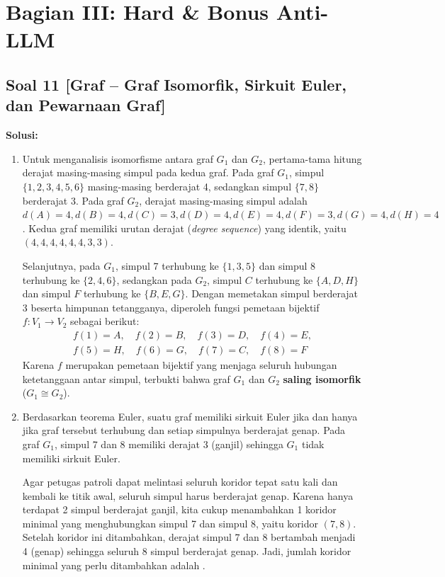 \documentclass[12pt,a4paper]{article}
\begin{document}
\newpage
\section*{Bagian III: Hard \& Bonus Anti-LLM}
\subsection*{Soal 11 [Graf -- Graf Isomorfik, Sirkuit Euler, dan Pewarnaan Graf]}
\textbf{Solusi:}

\begin{enumerate}[label=(\alph*)]
    \item Untuk menganalisis isomorfisme antara graf $G_1$ dan $G_2$, pertama-tama hitung derajat masing-masing simpul pada kedua graf. Pada graf $G_1$, simpul $\{1, 2, 3, 4, 5, 6\}$ masing-masing berderajat 4, sedangkan simpul $\{7, 8\}$ berderajat 3. Pada graf $G_2$, derajat masing-masing simpul adalah $d(A)=4, d(B)=4, d(C)=3, d(D)=4, d(E)=4, d(F)=3, d(G)=4, d(H)=4$. Kedua graf memiliki urutan derajat (\textit{degree sequence}) yang identik, yaitu $(4, 4, 4, 4, 4, 4, 3, 3)$. 
    
    Selanjutnya, pada $G_1$, simpul 7 terhubung ke $\{1, 3, 5\}$ dan simpul 8 terhubung ke $\{2, 4, 6\}$, sedangkan pada $G_2$, simpul $C$ terhubung ke $\{A, D, H\}$ dan simpul $F$ terhubung ke $\{B, E, G\}$. Dengan memetakan simpul berderajat 3 beserta himpunan tetangganya, diperoleh fungsi pemetaan bijektif $f: V_1 \to V_2$ sebagai berikut:
    \begin{align*}
        f(1) = A, \quad f(2) = B, \quad f(3) = D, \quad f(4) = E, \\
        f(5) = H, \quad f(6) = G, \quad f(7) = C, \quad f(8) = F
    \end{align*}
    Karena $f$ merupakan pemetaan bijektif yang menjaga seluruh hubungan ketetanggaan antar simpul, terbukti bahwa graf $G_1$ dan $G_2$ \textbf{saling isomorfik} ($G_1 \cong G_2$).

    \item Berdasarkan teorema Euler, suatu graf memiliki sirkuit Euler jika dan hanya jika graf tersebut terhubung dan setiap simpulnya berderajat genap. Pada graf $G_1$, simpul 7 dan 8 memiliki derajat 3 (ganjil) sehingga $G_1$ tidak memiliki sirkuit Euler. 
    
    Agar petugas patroli dapat melintasi seluruh koridor tepat satu kali dan kembali ke titik awal, seluruh simpul harus berderajat genap. Karena hanya terdapat 2 simpul berderajat ganjil, kita cukup menambahkan 1 koridor minimal yang menghubungkan simpul 7 dan simpul 8, yaitu koridor $(7, 8)$. Setelah koridor ini ditambahkan, derajat simpul 7 dan 8 bertambah menjadi 4 (genap) sehingga seluruh 8 simpul berderajat genap. Jadi, jumlah koridor minimal yang perlu ditambahkan adalah .


\end{enumerate}
\end{document}
